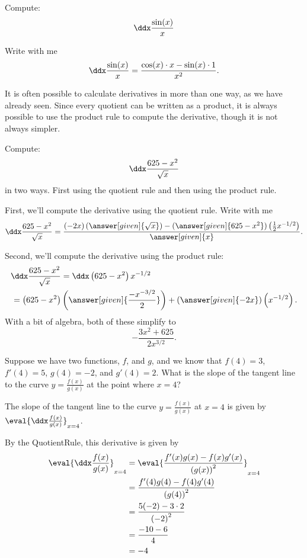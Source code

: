 \documentclass{ximera}
\begin{document}
\begin{example}
	Compute:
	\[\ddx \frac{\sin(x)}{x} \]
	
	\begin{explanation}
		Write with me
		\[\ddx \frac{\sin(x)}{x} =  \frac{\cos(x)\cdot x-\sin(x)\cdot1}{x^2}.\]
	\end{explanation}
\end{example}

It is often possible to calculate derivatives in more than one way, as
we have already seen. Since every quotient can be written as a
product, it is always possible to use the product rule to compute the
derivative, though it is not always simpler.

\begin{example}
	Compute: 
	\[ \ddx \frac{625-x^2}{\sqrt{x}} \] 
	in two ways. First using the quotient rule and then using the product rule.
	\begin{explanation}
		First, we'll compute the derivative using the quotient rule. Write with me
		\[ \ddx \frac{625-x^2}{\sqrt{x}} = \frac{\left(-2x\right)\left(\answer[given]{\sqrt{x}}\right) - (\answer[given]{625-x^2})\left(\frac{1}{2}x^{-1/2}\right)}{\answer[given]{x}}. \]
		
		Second, we'll compute the derivative using the product rule:
		\begin{align*}
			\ddx \frac{625-x^2}{\sqrt{x}} &= \ddx \left(625-x^2\right)x^{-1/2}\\
				=\left(625-x^2\right)&\left(\answer[given]{\frac{-x^{-3/2}}{2}}\right)+ (\answer[given]{-2x})\left(x^{-1/2}\right).
		\end{align*}
		With a bit of algebra, both of these simplify to
		\[ -\frac{3x^2+625}{2x^{3/2}}.\]
	\end{explanation}
\end{example}


\begin{example}
	Suppose we have two functions, $f$, and $g$, and we know that $f(4) = 3$, $f'(4) = 5$, $g(4) = -2$, and $g'(4) = 2$.
	What is the slope of the tangent line to the curve $y=\frac{f(x)}{g(x)}$ at the point where $x = 4$?
	\begin{explanation}
		The slope of the tangent line to the curve  $y=\frac{f(x)}{g(x)}$ at $x = 4$ is given by $ \eval{\ddx\frac{f(x)}{g(x)}}_{x=4}$.
	 
		  By the QuotientRule, this derivative is given by 
		 \begin{align*}
			\eval{\ddx\frac{f(x)}{g(x)}}_{x=4} &=\eval{\frac{f'(x)g(x)-f(x)g'(x)}{\left(g(x)\right)^2}}_{x=4}\\
				&=\frac{f'(4)g(4)-f(4)g'(4)}{\left(g(4)\right)^2}\\
				&=\frac{5(-2)-3\cdot2}{\left(-2\right)^2}\\
				&=\frac{-10-6}{4}\\
				&=-4
		\end{align*}
	\end{explanation}
\end{example} 
\end{document}
